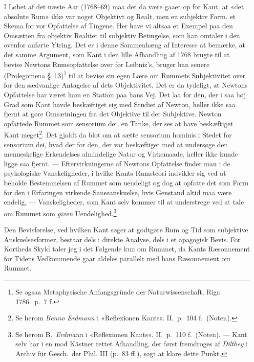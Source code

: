 \documentclass[12pt,a4paper]{article}
\begin{document}
I Løbet af det næste Aar (1768--69) maa det da være gaaet op for Kant, at
«det absolute Rum» ikke var noget Objektivt og Realt, men en subjektiv
Form, et Skema for vor Opfattelse af Tingene. Her have vi altsaa et
Exempel paa den Omsætten fra objektiv Realitet til subjektiv Betingelse,
som han omtaler i den ovenfor anførte Ytring. Det er i denne Sammenhæng
af Interesse at bemærke, at det samme Argument, som Kant i den lille
Afhandling af 1768 brugte til at bevise Newtons Rumsopfattelse over for
Leibniz's, bruger han senere (Prolegomena §\ 13)\footnote{Se ogsaa
Metaphysische Anfangsgründe der Naturwissenschaft. Riga 1786.\
p.\ 7 f.} til at bevise sin egen Lære om Rummets Subjektivitet over for
den sædvanlige Antagelse af dets Objektivitet. Det er da tydeligt, at
Newtons Opfattelse har været ham en Station paa hans Vej. Det laa for
den, der i saa høj Grad som Kant havde beskæftiget sig med Studiet af
Newton, heller ikke saa fjernt at gøre Omsætningen fra det Objektive til
det Subjektive. Newton opfattede Rummet som sensorium dei, en
Tanke, der ses at have beskæftiget Kant meget\footnote{Se herom \emph{Benno
Erdmann} i «Reflexionen Kants». II.\ p.\ 104 f.\ (Noten).}. Det gjaldt da
blot om at sætte sensorium hominis i Stedet for sensorium
dei, hvad der for den, der var beskæftiget med at undersøge den
menneskelige Erkendelses almindelige Natur og Virkemaade, heller ikke
kunde ligge saa fjernt. --- Eftervirkningerne af Newtons Opfattelse
finder man i de psykologiske Vanskeligheder, i hvilke Kants Rumsteori
indvikler sig ved at beholde Bestemmelsen af Rummet som uendeligt og dog
at opfatte det som Form for den i Erfaringen virkende Sanseanskuelse,
hvis Genstand altid maa være endelig, --- Vanskeligheder, som Kant selv
kommer til at understrege ved at tale om Rummet som \emph{given}
Uendelighed.\footnote{Se herom B.\ \emph{Erdmann} i «Reflexionen Kants«. II.\
p.\ 110 f.\ (Noten). --- Kant selv har i en mod Kästner rettet Afhandling,
der først fremdroges af \emph{Dilthey} i Archiv für Gesch.\ der Phil.
III (p.\ 83 ff.), søgt at klare dette Punkt.}

Den Bevisførelse, ved hvilken Kant søger at godtgøre Rum og Tid som
subjektive Anskuelsesformer, bestaar dels i direkte Analyse, dels i et
apagogisk Bevis. For Kortheds Skyld taler jeg i det Følgende kun om
Rummet, da Kants Ræsonnement for Tidens Vedkommende gaar aldeles parallelt
med hans Ræsonnement om Rummet.
\end{document}
